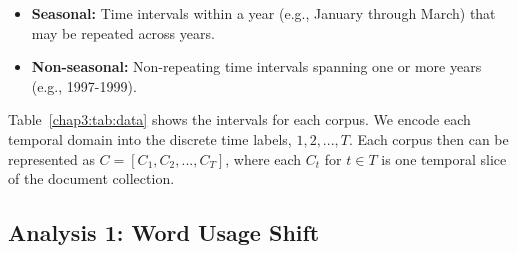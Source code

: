 \begin{itemize}
    \item {\bf Seasonal:} Time intervals within a year (e.g., January through March) that may be repeated across years.
    \item {\bf Non-seasonal:} Non-repeating time intervals spanning one or more years (e.g., 1997-1999).
\end{itemize}

Table~\ref{chap3:tab:data} shows the intervals for each corpus. 
We encode each temporal domain into the discrete time labels, $1, 2, ..., T$. Each corpus then can be represented as $C = [C_1, C_2, ..., C_T]$, where each $C_t$ for $t\in T$ is one temporal slice of the document collection.

\begin{table}
\centering
{}
\caption{Descriptions of corpora spanning multiple time intervals. Size is the number of documents. We use Yelp-hotel and -rest to denote the review data for hotel and restaurant categories. The $n/a$ denotes no periods for the corresponding dataset.}
\label{chap3:tab:data}
\end{table}


\subsection{Analysis 1: Word Usage Shift}
\label{chap3:subsec:wusage}

